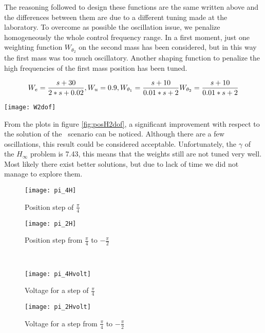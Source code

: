 The reasoning followed to design these functions are the same written above and the differences between them are due to a different tuning made at the laboratory. To overcome as possible the oscillation issue, we penalize homogeneously the whole control frequency range. In a first moment, just one weighting function $W_{\theta_{2}}$ on the second mass has been considered, but in this way the first mass was too much oscillatory. Another shaping function to penalize the high frequencies of the first mass position has been tuned.

\begin{equation}
	W_e=
	\frac{s+30}{2*s+0.02}
	\\
	,
	\\
	W_u=0.9
	\\
	,
	\\
	W_{\theta_{1}}=
	\frac{s+10}{0.01*s+2}
	\\
	W_{\theta_{2}}=
	\frac{s+10}{0.01*s+2}
\end{equation}

\begin{figure*}[h]
	\centering
	\texttt{[image: W2dof]}
	\caption{Weighting functions}
\end{figure*}


From the plots in figure \ref{fig:posH2dof}, a significant improvement with respect to the solution of the \onedof\ scenario can be noticed. Although there are a few oscillations, this result could be considered acceptable. Unfortunately, the $\gamma$ of the $H_\infty$ problem is 7.43, this means that the weights still are not tuned very well. Most likely there exist better solutions, but due to lack of time we did not manage to explore them.

 \begin{figure*}[h]
	\centering
	\begin{subfigure}{0.5\columnwidth}
		\texttt{[image: pi\_4H]}
		\caption{Position step of $\frac{\pi}{4}$}
	\end{subfigure}
	\begin{subfigure}{0.45\columnwidth}
		\texttt{[image: pi\_2H]}
		\caption{Position step from $\frac{\pi}{4}$ to $-\frac{\pi}{2}$}
	\end{subfigure}
	\\
	\begin{subfigure}{0.5\columnwidth}
		\texttt{[image: pi\_4Hvolt]}
		\caption{Voltage for a step of $\frac{\pi}{4}$}
	\end{subfigure}
	\begin{subfigure}{0.45\columnwidth}
		\texttt{[image: pi\_2Hvolt]}
		\caption{Voltage for a step from $\frac{\pi}{4}$ to $-\frac{\pi}{2}$}
	\end{subfigure}
	\caption{Position steps response}
	\label{fig:posH2dof}
\end{figure*}




 


